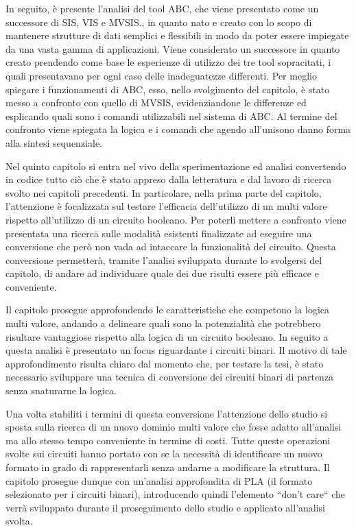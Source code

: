\documentclass[
]{book}
\begin{document}
In seguito, è presente l'analisi del tool ABC, che viene presentato come un successore di SIS, VIS e MVSIS., in quanto nato e creato con lo scopo di mantenere strutture di dati semplici e flessibili in modo da poter essere impiegate da una vasta gamma di applicazioni. Viene considerato un successore in quanto creato prendendo come base le esperienze di utilizzo dei tre tool sopracitati, i quali presentavano per ogni caso delle inadeguatezze differenti. Per meglio spiegare i funzionamenti di ABC, esso, nello svolgimento del capitolo, è stato messo a confronto con quello di MVSIS, evidenziandone le differenze ed esplicando quali sono i comandi utilizzabili nel sistema di ABC.
Al termine del confronto viene spiegata la logica e i comandi che agendo all'unisono danno forma alla sintesi sequenziale.

\newpage

Nel quinto capitolo si entra nel vivo della sperimentazione ed analisi convertendo in codice tutto ciò che è stato appreso dalla letteratura e dal lavoro di ricerca svolto nei capitoli precedenti. In particolare, nella prima parte del capitolo, l'attenzione è focalizzata sul testare l'efficacia dell'utilizzo di un multi valore rispetto all'utilizzo di un circuito booleano. Per poterli mettere a confronto viene presentata una ricerca sulle modalità esistenti finalizzate ad eseguire una conversione che però non vada ad intaccare la funzionalità del circuito. Questa conversione permetterà, tramite l'analisi sviluppata durante lo svolgersi del capitolo, di andare ad individuare quale dei due risulti essere più efficace e conveniente.

Il capitolo prosegue approfondendo le caratteristiche che competono la logica multi valore, andando a delineare quali sono la potenzialità che potrebbero risultare vantaggiose rispetto alla logica di un circuito booleano.
In seguito a questa analisi è presentato un focus riguardante i circuiti binari. Il motivo di tale approfondimento risulta chiaro dal momento che, per testare la tesi, è stato necessario sviluppare una tecnica di conversione dei circuiti binari di partenza senza snaturarne la logica.

Una volta stabiliti i termini di questa conversione l'attenzione dello studio si sposta sulla ricerca di un nuovo dominio multi valore che fosse adatto all'analisi ma allo stesso tempo conveniente in termine di costi.
Tutte queste operazioni svolte sui circuiti hanno portato con se la necessità di identificare un nuovo formato in grado di rappresentarli senza andarne a modificare la struttura. Il capitolo prosegue dunque con un'analisi approfondita di PLA (il formato selezionato per i circuiti binari), introducendo quindi l'elemento ``don't care`` che verrà sviluppato durante il proseguimento dello studio e applicato all'analisi svolta.
\end{document}
